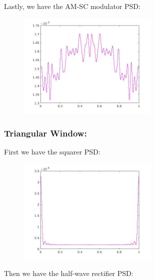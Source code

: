 \documentclass[a4paper,11pt]{article}
\begin{document}
\newpage

Lastly, we have the AM-SC modulator PSD:

\begin{figure}[!hp]
    \begin{center}
    \includegraphics[width=0.6\textwidth]{images/lab3_42.jpg}
    \end{center}
\end{figure}

\subsubsection{Triangular Window:}

First we have the squarer PSD:
\begin{figure}[!hp]
    \begin{center}
    \includegraphics[width=0.6\textwidth]{images/lab3_24.jpg}
    \end{center}
\end{figure}

\newpage

Then we have the half-wave rectifier PSD:
\end{document}
